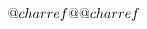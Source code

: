{{\[%
\gdef\XML@charref#1#2;{
  \begingroup
  \uppercase{\count@\if x\noexpand#1"\else#1\fi#2}\relax
  \ifnum\count@<"80\relax
    \uccode`\~\count@
    \uppercase{
    \ifnum\catcode\count@=\active
      \gdef\XML@tempa{\utfeightay~}
    \else
      \gdef\XML@tempa{~}
    \fi}
  \else\ifnum\count@<"800\relax
     \XML@utfeight@a,
     \XML@utfeight@b C\utfeightb.,
  \else\ifnum\count@<"10000\relax
     \XML@utfeight@a;
     \XML@utfeight@a,
     \XML@utfeight@b E\utfeightc.{,;}
   \else
     \XML@utfeight@a;
     \XML@utfeight@a,
     \XML@utfeight@a!
     \XML@utfeight@b F\utfeightd.{!,;}
    \fi
    \fi
  \fi
  \endgroup}

\global\let\XML@@charref\XML@charref


\gdef\XML@charref@tex#1#2;{
  \begingroup
  \uppercase{\count@\if x\noexpand#1"\else#1\fi#2}\relax
  \ifnum\count@<"80\relax
    \uccode`\~\count@
    \uppercase{
      \gdef\XML@tempa{\utfeightay~}}
  \else\ifnum\count@<"800\relax
     \XML@utfeight@a,
     \XML@utfeight@b C\utfeightb.,
  \else\ifnum\count@<"10000\relax
     \XML@utfeight@a;
     \XML@utfeight@a,
     \XML@utfeight@b E\utfeightc.{,;}
   \else
     \XML@utfeight@a;
     \XML@utfeight@a,
     \XML@utfeight@a!
     \XML@utfeight@b F\utfeightd.{!,;}
    \fi
    \fi
  \fi
  \endgroup}

\gdef\XML@utfeight@a#1{
     \@tempcnta\count@
     \divide\count@64
     \@tempcntb\count@
     \multiply\count@64
     \advance\@tempcnta-\count@
     \advance\@tempcnta"80
     \uccode`#1\@tempcnta
     \count@\@tempcntb}

\gdef\XML@utfeight@b#1#2#3#4{
     \advance\count@"#10\relax
     \uccode`#3\count@
     \uppercase{\gdef\XML@tempa{#2#3#4}}}



\gdef\xUnicodeCharacter#1#2{
   \begingroup
   \def\active{\catcode\count@}
   \XML@charref#1;
   \expandafter\expandafter\expandafter
   \expandafter\expandafter\expandafter
   \expandafter
    \gdef\XML@tempa{#2}
  \endgroup}

\gdef\UnicodeCharacter#1#2{\message{#1: Use active characters with XeTeX, not UnicodeCharacter}}

\]}}
